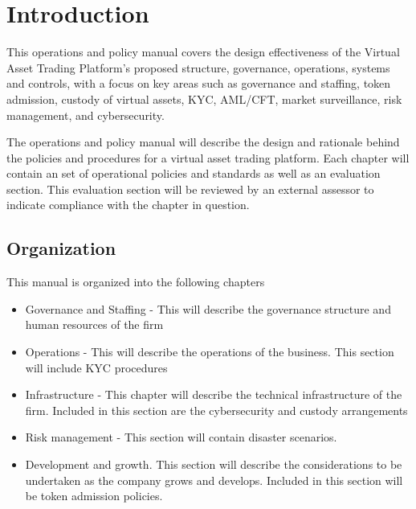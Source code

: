 \chapter{Introduction}

This operations and policy manual covers the design effectiveness of
the Virtual Asset Trading Platform's proposed structure, governance,
operations, systems and controls, with a focus on key areas such as
governance and staffing, token admission, custody of virtual assets,
KYC, AML/CFT, market surveillance, risk management, and cybersecurity.

The operations and policy manual will describe the design and
rationale behind the policies and procedures for a virtual asset
trading platform.  Each chapter will contain an set of operational
policies and standards as well as an evaluation section.  This
evaluation section will be reviewed by an external assessor to
indicate compliance with the chapter in question.

\section{Organization}

This manual is organized into the following chapters

\begin{itemize}
  \item Governance and Staffing - This will describe the governance
    structure and human resources of the firm
  \item Operations - This will describe the operations of the
    business.  This section will include KYC procedures
  \item Infrastructure - This chapter will describe the technical
    infrastructure of the firm.  Included in this section are the
    cybersecurity and custody arrangements
  \item Risk management - This section will contain disaster
    scenarios.
  \item Development and growth.  This section will describe the
    considerations to be undertaken as the company grows and develops.
    Included in this section will be token admission policies.
\end{itemize}
